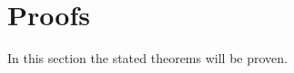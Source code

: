 \documentclass[a4paper, openany, oneside]{memoir}
\begin{document}
\section{Proofs}
\label{sec:proofs_detection}
In this section the stated theorems will be proven.

\end{document}
